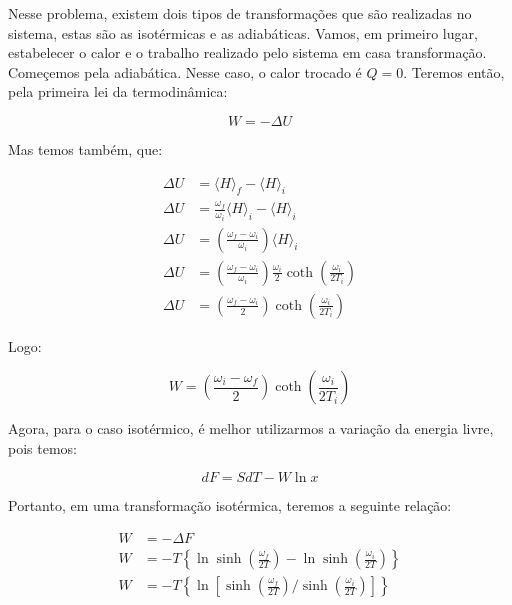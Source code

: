 Nesse problema, existem dois tipos de transformações que são realizadas no sistema, estas são as isotérmicas e as adiabáticas. Vamos, em primeiro lugar, estabelecer o calor e o trabalho realizado pelo sistema em casa transformação. Começemos pela adiabática. Nesse caso, o calor trocado é $Q=0$. Teremos então, pela primeira lei da termodinâmica:

\begin{equation}
W = - \Delta U
\end{equation}

Mas temos também, que:

\begin{equation}
\begin{split}
\Delta U &= \langle H \rangle_f - \langle H \rangle_i \\
\Delta U &= \frac{\omega_f}{\omega_i} \langle H \rangle_i - \langle H \rangle_i \\
\Delta U &= \left( \frac{\omega_f - \omega_i}{\omega_i} \right) \langle H \rangle_i \\
\Delta U &= \left( \frac{\omega_f - \omega_i}{\omega_i} \right) \frac{\omega_i}{2} \coth \left( \frac{\omega_i}{2 T_i} \right) \\
\Delta U &= \left( \frac{\omega_f - \omega_i}{2} \right) \coth \left( \frac{\omega_i}{2 T_i} \right)
\end{split}
\end{equation}

Logo:

\begin{equation}
W = \left( \frac{\omega_i - \omega_f}{2} \right) \coth \left( \frac{\omega_i}{2 T_i} \right)
\end{equation}

Agora, para o caso isotérmico, é melhor utilizarmos a variação da energia livre, pois temos:

\begin{equation}
d F = S d T - W \ln x
\end{equation}

Portanto, em uma transformação isotérmica, teremos a seguinte relação:

\begin{equation}
\begin{split}
W &= - \Delta F \\
W &= - T \left\{ \ln \sinh \left( \frac{\omega_f}{2 T} \right) - \ln \sinh \left( \frac{\omega_i}{2 T} \right) \right\} \\
W &= - T \left\{ \ln \left[ \sinh \left( \frac{\omega_f}{2 T} \right) \Big/ \sinh \left( \frac{\omega_i}{2 T} \right) \right] \right\}
\end{split}
\end{equation}

